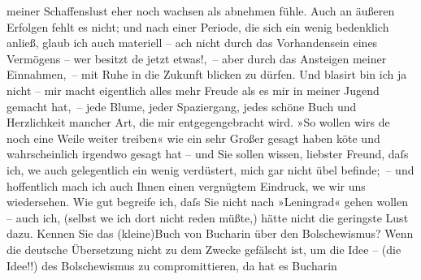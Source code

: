 \begin{ledgroupsized}[t]{13cm}
               meiner Schaffenslust eher noch wachsen als abnehmen fühle. Auch an äußeren Erfolgen
               fehlt es nicht; und nach einer Periode, die sich ein wenig bedenklich anließ, glaub
               ich auch materiell – ach nicht durch das Vorhandensein eines Vermögens – wer besitzt
                  de{\geminationn} jetzt etwas!, – aber durch das Ansteigen meiner
               Einnahmen, – mit Ruhe in die Zukunft blicken zu dürfen. Und blasirt bin ich ja nicht
               – mir macht eigentlich alles mehr Freude als es mir in meiner Jugend gemacht hat, –
               jede Blume, jeder Spaziergang, jedes schöne Buch und Herzlichkeit mancher Art, die
               mir entgegengebracht wird. »So wollen wirs de{\geminationn} noch eine
               Weile weiter treiben« wie ein sehr Großer gesagt haben kö{\geminationn}te und wahrscheinlich irgendwo gesagt hat – und Sie sollen wissen, liebster Freund,
               daſs ich, we{\geminationn} auch gelegentlich ein wenig verdüstert,
                  {\pb}mich gar nicht übel befinde; – und hoffentlich
               mach ich auch Ihnen einen vergnügtem Eindruck, we{\geminationn} wir
               uns wiedersehen.\pend
           \pstart
           Wie gut begreife ich, daſs Sie nicht nach »Leningrad« gehen wollen – auch ich, (selbst we{\geminationn}
               ich dort nicht reden müßte,) hätte nicht die geringste Lust dazu. Kennen Sie das \introOben{}(kleine)\introOben{}{ }Buch von Bucharin über den Bolschewismus? Wenn die
               deutsche Übersetzung nicht \label{T_L02444-2v}\label{T_L02444-2h} zu dem Zwecke gefälscht ist, um
               die Idee – (die Idee!!) des Bolschewismus zu compromittieren, da{\geminationn} hat es Bucharin

\end{ledgroupsized}
